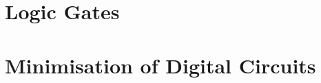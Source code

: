 \section{Logic Gates}
\label{sec:LogicGates}

\section{Minimisation of Digital Circuits}


\newpage
